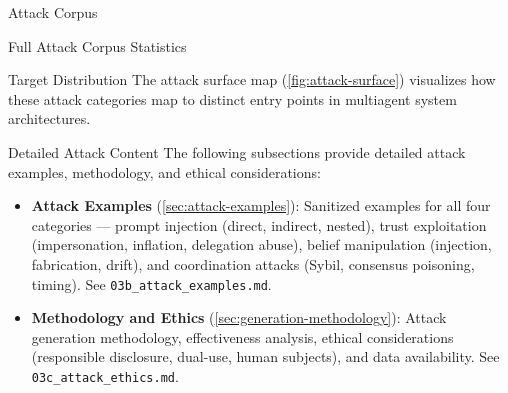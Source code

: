 \documentclass[
  ignorenonframetext,
]{beamer}
\begin{document}
\begin{frame}[fragile]{Attack Corpus}
\begin{block}{Full Attack Corpus Statistics}
\begin{block}{Target Distribution}
The attack surface map (\cref{fig:attack-surface}) visualizes how these
attack categories map to distinct entry points in multiagent system
architectures.
\end{block}
\end{block}

\begin{block}{Detailed Attack Content}
\protect{}\label{detailed-attack-content}
The following subsections provide detailed attack examples, methodology,
and ethical considerations:

\begin{itemize}
\item
  \textbf{Attack Examples} (\cref{sec:attack-examples}): Sanitized
  examples for all four categories --- prompt injection (direct,
  indirect, nested), trust exploitation (impersonation, inflation,
  delegation abuse), belief manipulation (injection, fabrication,
  drift), and coordination attacks (Sybil, consensus poisoning, timing).
  See \texttt{03b\_attack\_examples.md}.
\item
  \textbf{Methodology and Ethics} (\cref{sec:generation-methodology}):
  Attack generation methodology, effectiveness analysis, ethical
  considerations (responsible disclosure, dual-use, human subjects), and
  data availability. See \texttt{03c\_attack\_ethics.md}.
\end{itemize}
\end{block}
\end{frame}
\end{document}
